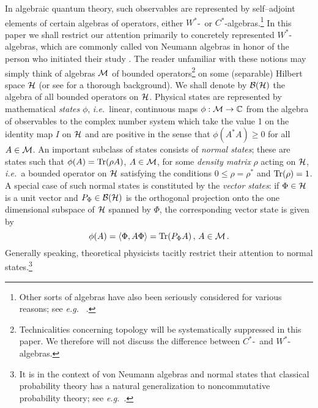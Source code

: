 \documentclass[12pt]{article}
\newcommand{\ie}{{\it i.e.\ }}
\newcommand{\eg}{{\it e.g.\ }}
\def\Bs{{\cal B}}
\def\Hs{{\cal H}}
\def\Ms{{\cal M}}
\def\CC{{\mathbb C}}
\def\C{$C^{\ast}$-}
\def\W{$W^{\ast}$-}
\def\tr{{\rm Tr}}
\begin{document}
     In algebraic quantum theory, such observables are represented
by self--adjoint elements of certain algebras of operators,
either \W\ or \C algebras.\footnote{Other sorts of algebras
have also been seriously considered for various reasons; see \eg 
\cite{Em,Schw,Seg}.} In this paper we shall restrict our attention primarily
to concretely represented \W algebras, which are commonly
called von Neumann algebras in honor of the person who initiated their
study \cite{NeuI}. The reader unfamiliar with
these notions may simply think of algebras $\Ms$ of bounded 
operators\footnote{Technicalities concerning topology will be 
systematically suppressed in this paper. We therefore will not discuss
the difference between \C\ and \W algebras.}
on some (separable) Hilbert space $\Hs$ (or see 
\cite{KaRi1,KaRi2,Tak1,Tak2,Tak3} for a thorough background).
We shall denote by $\Bs(\Hs)$ the algebra of all bounded operators on
$\Hs$. Physical states are represented by mathematical {\it states} $\phi$, 
\ie linear, continuous maps $\phi : \Ms \rightarrow \CC$ from the algebra 
of observables to the complex number system which take the value 1 on 
the identity map $I$ on $\Hs$ and are positive in the sense that
$\phi(A^* A) \geq 0$ for all $A \in \Ms$. An important subclass of
states consists of {\it normal states}; these are states such that
$\phi(A) = \tr(\rho A)$, $A \in \Ms$, for some {\it density matrix} 
$\rho$ acting on $\Hs$, \ie a bounded operator on $\Hs$ satisfying
the conditions $0 \leq \rho = \rho^*$ and $\tr(\rho) = 1$. A special 
case of such normal states is constituted by the {\it vector states}: 
if $\Phi \in \Hs$ is a unit vector and $P_\Phi \in \Bs(\Hs)$ is the 
orthogonal projection onto the one dimensional subspace of $\Hs$ spanned 
by $\Phi$, the corresponding vector state is given by
%
$$\phi(A) = \langle \Phi, A \Phi \rangle = \tr(P_\Phi A) \, , \,
A \in \Ms \, .$$
%
Generally speaking, theoretical physicists tacitly restrict their
attention to normal states.\footnote{It is in the context of von Neumann
algebras and normal states that classical probability theory has a
natural generalization to noncommutative probability theory; see 
\eg \cite{ReSu2}.} 
\end{document}
